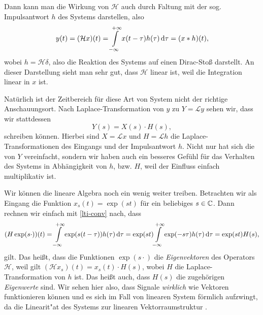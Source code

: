 Dann kann man die Wirkung von $\mathcal{H}$ auch durch Faltung mit der sog. Impulsantwort $h$ des Systems darstellen, also
%
\begin{equation}\label{lti-conv}
    y(t) 
        = (\mathcal{H}x)(t) 
        = {\int\limits_{-\infty}^{+\infty}{x(t - \tau) h(\tau)}\,\mathrm{d}{\tau}} 
        = (x \ast h)(t),
\end{equation}
%
wobei $h = \mathcal{H}\delta$, also die Reaktion des Systems auf einen Dirac-Sto\ss{} darstellt.
An dieser Darstellung sieht man sehr gut, dass $\mathcal{H}$ linear ist, weil die Integration linear in $x$ ist.

Nat\"urlich ist der Zeitbereich f\"ur diese Art von System nicht der richtige Anschauungsort. 
Nach Laplace-Transformation von $y$ zu $Y = \mathcal{L}y$ sehen wir, dass wir stattdessen 
\[
Y(s) = X(s) \cdot H(s),
\]
schreiben k\"onnen. 
Hierbei sind $X = \mathcal{L}x$ und $H = \mathcal{L}h$ die Laplace-Transformationen des Eingangs und der Impulsantwort $h$.
Nicht nur hat sich die  von $Y$ vereinfacht, sondern wir haben auch ein besseres Gef\"uhl f\"ur das Verhalten des Systems in Abh\"angigkeit von $h$, bzw. $H$, weil der Einfluss einfach multiplikativ ist.

Wir k\"onnen die lineare Algebra noch ein wenig weiter treiben. Betrachten wir als Eingang die Funktion $x_s(t) = \exp(s t)$ f\"ur ein beliebiges $s \in \mathbb{C}$.
Dann rechnen wir einfach mit \eqref{lti-conv} nach, dass
\[
(H\exp(s\cdot))(t) 
    = {\int\limits_{-\infty}^{+\infty}{\exp(s (t-\tau))h(\tau)}\,\mathrm{d}{\tau}}
    = \exp(s t) {\int\limits_{-\infty}^{+\infty}{\exp(-s\tau)h(\tau)}\,\mathrm{d}{\tau}}
    = \exp(s t) H(s),
\]
gilt. Das hei\ss{}t, dass die Funktionen $\exp(s \cdot)$ die \emph{Eigenvektoren} des Operators $\mathcal{H}$, weil gilt $(\mathcal{H} x_s)(t) = x_s(t) \cdot H(s)$, wobei $H$ die Laplace-Transformation von $h$ ist.
Das hei\ss{}t auch, dass $H(s)$ die zugeh\"origen \emph{Eigenwerte} sind.
Wir sehen hier also, dass Signale \emph{wirklich} wie Vektoren funktionieren k\"onnen und es sich im Fall von linearen System f\"ormlich aufzwingt, da die Linearit"at des Systems zur linearen Vektorraumstruktur .